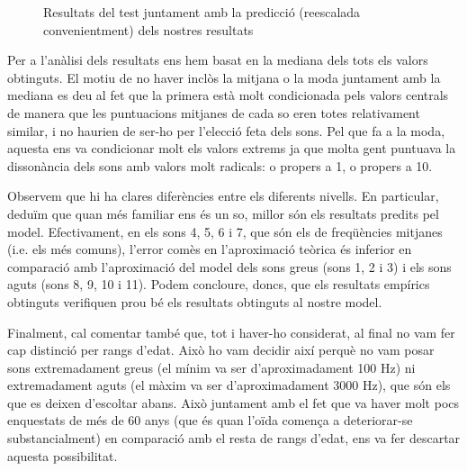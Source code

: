 \documentclass{article}
\theoremstyle{math}
\theoremstyle{TheoremNum}
\newcommand{\0}{\ensuremath{\vb{0}}}
\begin{document}
\begin{figure}[ht]
    \centering
    
    \caption{Resultats del test juntament amb la predicció (reescalada convenientment) dels nostres resultats}
\end{figure}
Per a l'anàlisi dels resultats ens hem basat en la mediana dels tots els valors obtinguts. El motiu de no haver inclòs la mitjana o la moda juntament amb la mediana es deu al fet que la primera està molt condicionada pels valors centrals de manera que les puntuacions mitjanes de cada so eren totes relativament similar, i no haurien de ser-ho per l'elecció feta dels sons. Pel que fa a la moda, aquesta ens va condicionar molt els valors extrems ja que molta gent puntuava la dissonància dels sons amb valors molt radicals: o propers a 1, o propers a 10.\par
Observem que hi ha clares diferències entre els diferents nivells. En particular, deduïm que quan més familiar ens és un so, millor són els resultats predits pel model. Efectivament, en els sons 4, 5, 6 i 7, que són els de freqüències mitjanes (i.e. els més comuns), l'error comès en l'aproximació teòrica és inferior en comparació amb l'aproximació del model dels sons greus (sons 1, 2 i 3) i els sons aguts (sons 8, 9, 10 i 11). Podem concloure, doncs, que els resultats empírics obtinguts verifiquen prou bé els resultats obtinguts al nostre model.\par Finalment, cal comentar també que, tot i haver-ho considerat, al final no vam fer cap distinció per rangs d'edat. Això ho vam decidir així perquè no vam posar sons extremadament greus (el mínim va ser d'aproximadament 100 Hz) ni extremadament aguts (el màxim va ser d'aproximadament 3000 Hz), que són els que es deixen d'escoltar abans. Això juntament amb el fet que va haver molt pocs enquestats de més de 60 anys (que és quan l'oïda comença a deteriorar-se substancialment) en comparació amb el resta de rangs d'edat, ens va fer descartar aquesta possibilitat.
\end{document}
